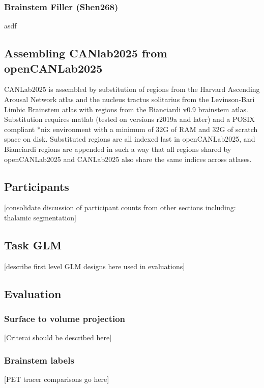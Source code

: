\documentclass[10pt,letterpaper]{article}
\begin{document}
\subsubsection{Brainstem Filler (Shen268)} asdf
\\
\subsection{Assembling CANlab2025 from openCANLab2025}
CANLab2025 is assembled by substitution of regions from the Harvard Ascending Arousal Network atlas and the nucleus tractus solitarius from the Levinson-Bari Limbic Brainstem atlas with regions from the Bianciardi v0.9 brainstem atlas. Substitution requires matlab (tested on versions r2019a and later) and a POSIX compliant *nix environment with a minimum of 32G of RAM and 32G of scratch space on disk. Substituted regions are all indexed last in openCANLab2025, and Bianciardi regions are appended in such a way that all regions shared by openCANLab2025 and CANLab2025 also share the same indices across atlases.

\subsection{Participants}

[consolidate discussion of participant counts from other sections including: thalamic segmentation]

\subsection{Task GLM}
[describe first level GLM designs here used in evaluations]

\subsection{Evaluation}

\subsubsection{Surface to volume projection} [Criterai should be described here]

\subsubsection{Brainstem labels} [PET tracer comparisons go here]

\end{document}
